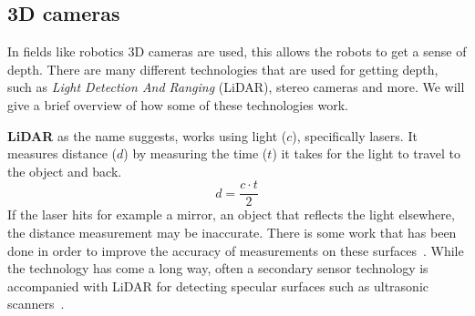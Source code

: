 \begin{figure}
    \centering
    \qquad
    \caption{}
\end{figure}


\subsection{3D cameras}
In fields like robotics 3D cameras are used, this allows the robots to get a
sense of depth. There are many different technologies that are used for getting
depth, such as \textit{Light Detection And Ranging} (LiDAR), stereo
cameras and more. We will give a brief overview of how some of these
technologies work.

\textbf{LiDAR} as the name suggests, works using light ($c$), specifically
lasers. It measures distance ($d$) by measuring the time ($t$) it takes for the
light to travel to the object and back.
\[
    d = \frac{c \cdot t}{2}
\]
If the laser hits for example a mirror, an object that reflects the light
elsewhere, the distance measurement may be inaccurate. There is some work that
has been done in order to improve the accuracy of measurements on these
surfaces~\cite{foster2013visagge, henley23lidar}. While the technology has come
a long way, often a secondary sensor technology is accompanied with LiDAR for
detecting specular surfaces such as ultrasonic scanners~\cite{diosi2004advanced}.


